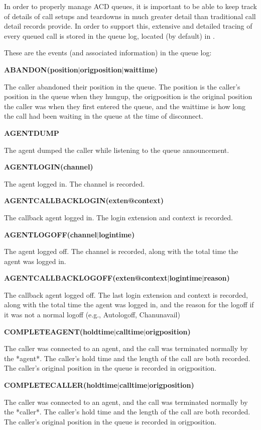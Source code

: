 In order to properly manage ACD queues, it is important to be able to
keep track of details of call setups and teardowns in much greater detail
than traditional call detail records provide.  In order to support this,
extensive and detailed tracing of every queued call is stored in the
queue log, located (by default) in .

These are the events (and associated information) in the queue log:

\textbf{ABANDON(position$|$origposition$|$waittime)}

The caller abandoned their position in the queue.  The position is the
caller's position in the queue when they hungup, the origposition is
the original position the caller was when they first entered the
queue, and the waittime is how long the call had been waiting in the
queue at the time of disconnect.

\textbf{AGENTDUMP}

The agent dumped the caller while listening to the queue announcement.

\textbf{AGENTLOGIN(channel)}

The agent logged in.  The channel is recorded.

\textbf{AGENTCALLBACKLOGIN(exten@context)}

The callback agent logged in.  The login extension and context is recorded.

\textbf{AGENTLOGOFF(channel$|$logintime)}

The agent logged off.  The channel is recorded, along with the total time
the agent was logged in.

\textbf{AGENTCALLBACKLOGOFF(exten@context$|$logintime$|$reason)}

The callback agent logged off.  The last login extension and context is
recorded, along with the total time the agent was logged in, and the
reason for the logoff if it was not a normal logoff
(e.g., Autologoff, Chanunavail)

\textbf{COMPLETEAGENT(holdtime$|$calltime$|$origposition)}

The caller was connected to an agent, and the call was terminated normally
by the *agent*.  The caller's hold time and the length of the call are both
recorded.  The caller's original position in the queue is recorded in
origposition.

\textbf{COMPLETECALLER(holdtime$|$calltime$|$origposition)}

The caller was connected to an agent, and the call was terminated normally
by the *caller*.  The caller's hold time and the length of the call are both
recorded.  The caller's original position in the queue is recorded in
origposition.

